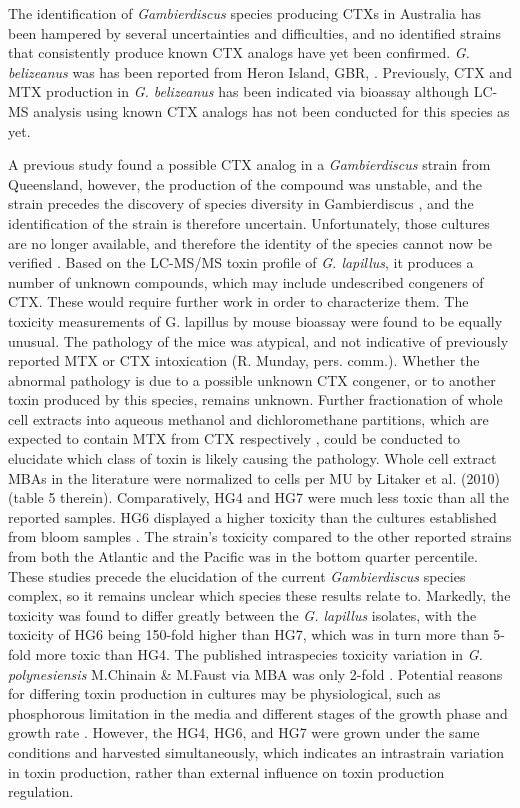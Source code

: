 \documentclass[12pt]{article}
\begin{document}
The identification of \textit{Gambierdiscus} species producing CTXs in Australia has been hampered by several uncertainties and difficulties, and no identified strains that consistently produce known CTX analogs have yet been confirmed.
\emph{G. belizeanus} was has been reported from Heron Island, GBR, \citep{murray2014molecular}. 
Previously, CTX and MTX production in \emph{G. belizeanus} has been indicated via bioassay \citep{chinain2010growth,holland2013differences} although LC-MS analysis using known CTX analogs has not been conducted for this species as yet. 

A previous study found a possible CTX analog in a \textit{Gambierdiscus} strain from Queensland, however, the production of the compound was unstable, and the strain precedes the discovery of species diversity in Gambierdiscus \citep{holmes1991strain}, and the identification of the strain is therefore uncertain. 
Unfortunately, those cultures are no longer available, and therefore the identity of the species cannot now be verified \citep{holmes1991strain}. Based on the LC-MS/MS toxin profile of \textit{G. lapillus}, it produces a number of unknown compounds, which may include undescribed congeners of CTX. 
These would require further work in order to characterize them. 
The toxicity measurements of G. lapillus by mouse bioassay were found to be equally unusual. 
The pathology of the mice was atypical, and not indicative of previously reported MTX or CTX intoxication (R. Munday, pers. comm.). 
Whether the abnormal pathology is due to a possible unknown CTX congener, or to another toxin produced by this species, remains unknown. 
Further fractionation of whole cell extracts into aqueous methanol and dichloromethane partitions, which are expected to contain MTX from CTX respectively \citep{satake1993structure}, could be conducted to elucidate which class of toxin is likely causing the pathology. 
Whole cell extract MBAs in the literature were normalized to cells per MU by Litaker et al. (2010) (table 5 therein). 
Comparatively, HG4 and HG7 were much less toxic than all the reported samples. 
HG6 displayed a higher toxicity than the cultures established from bloom samples \citep{chinain1999seasonal}. 
The strain’s toxicity compared to the other reported strains from both the Atlantic and the Pacific was in the bottom quarter percentile. 
These studies precede the elucidation of the current \textit{Gambierdiscus} species complex, so it remains unclear which species these results relate to. 
Markedly, the toxicity was found to differ greatly between the \textit{G. lapillus} isolates, with the toxicity of HG6 being 150-fold higher than HG7, which was in turn more than 5-fold more toxic than HG4. 
The published intraspecies toxicity variation in \textit{G. polynesiensis} M.Chinain \& M.Faust via MBA was only 2-fold \citep{chinain2010growth}. Potential reasons for differing toxin production in cultures may be physiological, such as phosphorous limitation in the media and different stages of the growth phase and growth rate \cite{sperr1996variation,chinain2010growth}. 
However, the HG4, HG6, and HG7 were grown under the same conditions and harvested simultaneously, which indicates an intrastrain variation in toxin production, rather than external influence on toxin production regulation.
\end{document}
